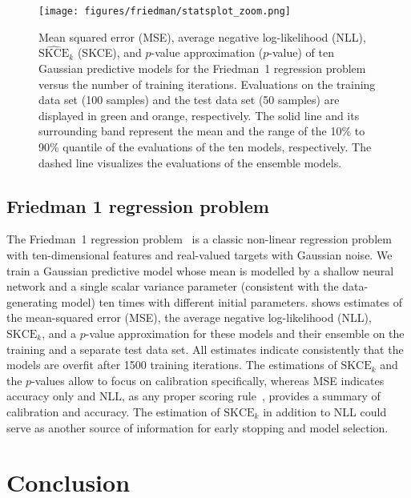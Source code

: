 \documentclass{article}
\begin{document}
\begin{figure}[!hbtp]
    \centering
    \texttt{[image: figures/friedman/statsplot\_zoom.png]}
    \caption{Mean squared error (MSE), average negative log-likelihood (NLL),
    $\widehat{\mathrm{SKCE}}_k$ (SKCE), and $p$-value approximation ($p$-value) of
    ten Gaussian predictive models for the Friedman~1 regression problem versus
    the number of training iterations.
    Evaluations on the training data set (100 samples) and the test data set
    (50 samples) are displayed in green and orange, respectively. The solid line
    and its surrounding band represent the mean and the range of the 10\% to 90\%
    quantile of the evaluations of the ten models, respectively. The dashed line visualizes the
    evaluations of the ensemble models.}%
    \label{fig:friedman1_zoom}
    \vspace{-\baselineskip}
\end{figure}

\subsection{Friedman 1 regression problem}

The Friedman~1 regression problem~\citep{Friedman1979,Friedman1983,Friedman1991}
is a classic non-linear regression problem with ten-dimensional features and
real-valued targets with Gaussian noise. We train a Gaussian predictive model
whose mean is modelled by a shallow neural network and %
a single scalar
variance
parameter (consistent with the data-generating model) ten times
with different initial parameters.  shows estimates of the
mean-squared error (MSE),
the average negative log-likelihood (NLL), $\mathrm{SKCE}_k$, and a $p$-value
approximation for these models and their ensemble on the training and a separate
test data set.
All estimates indicate consistently
that the models are overfit after 1500 training iterations. The estimations of
$\mathrm{SKCE}_k$ and the $p$-values allow to focus on calibration specifically,
whereas MSE indicates accuracy only and NLL, as any proper scoring rule~\citep{Broecker2009}, provides a summary of calibration and accuracy. The estimation
of $\mathrm{SKCE}_k$ in addition to NLL could serve as another source of information
for early stopping and model selection.

\section{Conclusion}
\end{document}
